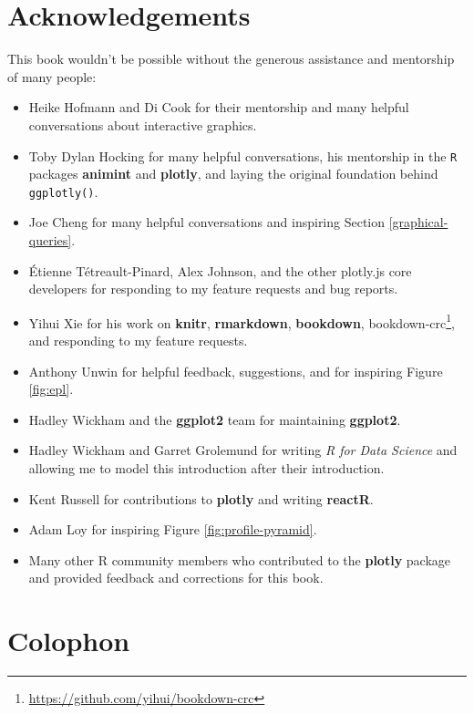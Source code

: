 \documentclass[
  12pt,
]{krantz}
\providecommand{\tightlist}{%
  \setlength{\itemsep}{0pt}\setlength{\parskip}{0pt}}
\renewcommand{\href}[2]{#2\footnote{\url{#1}}}
\begin{document}
\hypertarget{acknowledgements}{%
\section{Acknowledgements}\label{acknowledgements}}

This book wouldn't be possible without the generous assistance and mentorship of many people:

\begin{itemize}
\tightlist
\item
  Heike Hofmann and Di Cook for their mentorship and many helpful conversations about interactive graphics.
\item
  Toby Dylan Hocking for many helpful conversations, his mentorship in the \texttt{R} packages \textbf{animint} and \textbf{plotly}, and laying the original foundation behind \texttt{ggplotly()}.
\item
  Joe Cheng for many helpful conversations and inspiring Section \ref{graphical-queries}.
\item
  Étienne Tétreault-Pinard, Alex Johnson, and the other plotly.js core developers for responding to my feature requests and bug reports.
\item
  Yihui Xie for his work on \textbf{knitr}, \textbf{rmarkdown}, \textbf{bookdown}, \href{https://github.com/yihui/bookdown-crc}{bookdown-crc}, and responding to my feature requests.
\item
  Anthony Unwin for helpful feedback, suggestions, and for inspiring Figure \ref{fig:epl}.
\item
  Hadley Wickham and the \textbf{ggplot2} team for maintaining \textbf{ggplot2}.
\item
  Hadley Wickham and Garret Grolemund for writing \emph{R for Data Science} and allowing me to model this introduction after their introduction.
\item
  Kent Russell for contributions to \textbf{plotly} and writing \textbf{reactR}.
\item
  Adam Loy for inspiring Figure \ref{fig:profile-pyramid}.
\item
  Many other R community members who contributed to the \textbf{plotly} package and provided feedback and corrections for this book.
\end{itemize}

\hypertarget{colophon}{%
\section{Colophon}\label{colophon}}
\end{document}
